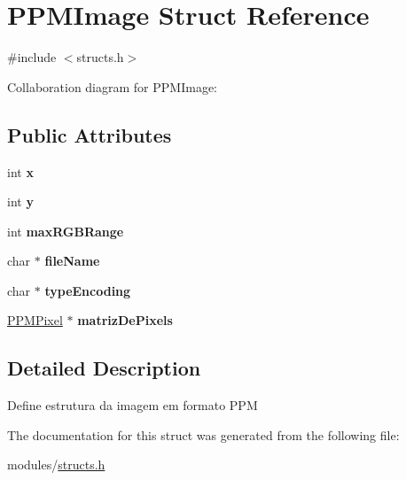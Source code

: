 \hypertarget{structPPMImage}{}\section{P\+P\+M\+Image Struct Reference}
\label{structPPMImage}


{\ttfamily \#include $<$structs.\+h$>$}



Collaboration diagram for P\+P\+M\+Image\+:
\subsection*{Public Attributes}
\begin{DoxyCompactItemize}
\item 
\mbox{\label{structPPMImage_a765c5c5e793258387b781c352c4b4a21}} 
int {\bfseries x}
\item 
\mbox{\label{structPPMImage_aefb901e835fb212586ecc0a12c76817a}} 
int {\bfseries y}
\item 
\mbox{\label{structPPMImage_ad5fa6f38730e7ae0cfc8ac4bf3782e68}} 
int {\bfseries max\+R\+G\+B\+Range}
\item 
\mbox{\label{structPPMImage_a64ce4d442a151abdd0241ec7aeda6203}} 
char $\ast$ {\bfseries file\+Name}
\item 
\mbox{\label{structPPMImage_a57a9a780b5541560f3126a2fe65b2e81}} 
char $\ast$ {\bfseries type\+Encoding}
\item 
\mbox{\label{structPPMImage_aeed9e7624e3afaf979e7aa8dba35de67}} 
\hyperlink{structPPMPixel}{P\+P\+M\+Pixel} $\ast$ {\bfseries matriz\+De\+Pixels}
\end{DoxyCompactItemize}


\subsection{Detailed Description}
Define estrutura da imagem em formato P\+PM 

The documentation for this struct was generated from the following file\+:\begin{DoxyCompactItemize}
\item 
modules/\hyperlink{structs_8h}{structs.\+h}\end{DoxyCompactItemize}
